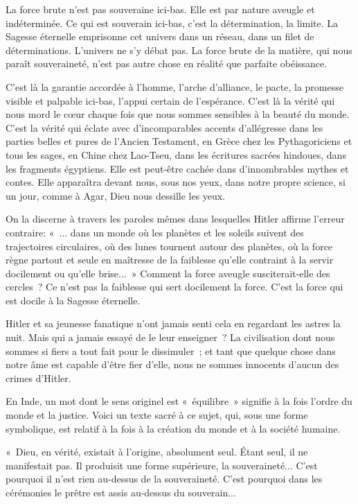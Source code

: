 \documentclass[french,twoside]{book} %
\begin{document}
La force brute n'est pas souveraine ici-bas. Elle est par nature aveugle et indéterminée. Ce qui est souverain ici-bas, c'est la détermination, la limite. La Sagesse éternelle emprisonne cet univers dans un réseau, dans un filet de déterminations. L'univers ne s'y débat pas. La force brute de la matière, qui nous paraît souveraineté, n'est pas autre chose en réalité que parfaite obéissance.\par
C'est là la garantie accordée à l'homme, l'arche d'alliance, le pacte, la promesse visible et palpable ici-bas, l'appui certain de l'espérance. C'est là la vérité qui nous mord le cœur chaque fois que nous sommes sensibles à la beauté du monde. C'est la vérité qui éclate avec d'incomparables accents d'allégresse dans les parties belles et pures de l'Ancien Testament, en Grèce chez les Pythagoriciens et tous les sages, en Chine chez Lao-Tseu, dans les écritures sacrées hindoues, dans les fragments égyptiens. Elle est peut-être cachée dans d'innombrables mythes et contes. Elle apparaîtra devant nous, sous nos yeux, dans notre propre science, si un jour, comme à Agar, Dieu nous dessille les yeux.\par
On la discerne à travers les paroles mêmes dans lesquelles Hitler affirme l'erreur contraire: « ... dans un monde où les planètes et les soleils suivent des trajectoires circulaires, où des lunes tournent autour des planètes, où la force règne partout et seule en maîtresse de la faiblesse qu'elle contraint à la servir docilement ou qu'elle brise... » Comment la force aveugle susciterait-elle des cercles ? Ce n'est pas la faiblesse qui sert docilement la force. C'est la force qui est docile à la Sagesse éternelle.\par
Hitler et sa jeunesse fanatique n'ont jamais senti cela en regardant les astres la nuit. Mais qui a jamais essayé de le leur enseigner ? La civilisation dont nous sommes si fiers a tout fait pour le dissimuler ; et tant que quelque chose dans notre âme est capable d'être fier d'elle, nous ne sommes innocents d'aucun des crimes d'Hitler.\par
En Inde, un mot dont le sens originel est « équilibre » signifie à la fois l'ordre du monde et la justice. Voici un texte sacré à ce sujet, qui, sous une forme symbolique, est relatif à la fois à la création du monde et à la société humaine.\par
\par
« Dieu, en vérité, existait à l'origine, absolument seul. Étant seul, il ne manifestait pas. Il produisit une forme supérieure, la souveraineté... C'est pourquoi il n'est rien au-dessus de la souveraineté. C'est pourquoi dans les cérémonies le prêtre est assis au-dessus du souverain...\par
\end{document}
